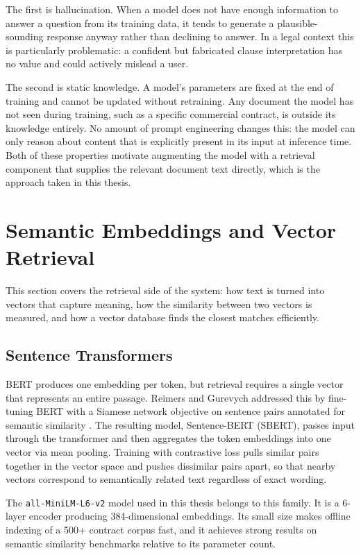 The first is hallucination. When a model does not have enough information to answer a question from its training data, it tends to generate a plausible-sounding response anyway rather than declining to answer. In a legal context this is particularly problematic: a confident but fabricated clause interpretation has no value and could actively mislead a user.

The second is static knowledge. A model's parameters are fixed at the end of training and cannot be updated without retraining. Any document the model has not seen during training, such as a specific commercial contract, is outside its knowledge entirely. No amount of prompt engineering changes this: the model can only reason about content that is explicitly present in its input at inference time. Both of these properties motivate augmenting the model with a retrieval component that supplies the relevant document text directly, which is the approach taken in this thesis.

\section{Semantic Embeddings and Vector Retrieval}

This section covers the retrieval side of the system: how text is turned into vectors that capture meaning, how the similarity between two vectors is measured, and how a vector database finds the closest matches efficiently.


\subsection{Sentence Transformers}

BERT produces one embedding per token, but retrieval requires a 
single vector that represents an entire passage. Reimers and Gurevych 
addressed this by fine-tuning BERT with a Siamese network objective 
on sentence pairs annotated for semantic similarity \cite{reimers2019sbert}. 
The resulting model, Sentence-BERT (SBERT), passes input through 
the transformer and then aggregates the token embeddings into one 
vector via mean pooling. Training with contrastive loss pulls similar 
pairs together in the vector space and pushes dissimilar pairs apart, 
so that nearby vectors correspond to semantically related text 
regardless of exact wording.

The \texttt{all-MiniLM-L6-v2} model used in this thesis belongs to 
this family. It is a 6-layer encoder producing 384-dimensional 
embeddings. Its small size makes offline indexing of a 500+ contract 
corpus fast, and it achieves strong results on semantic similarity 
benchmarks relative to its parameter count.


